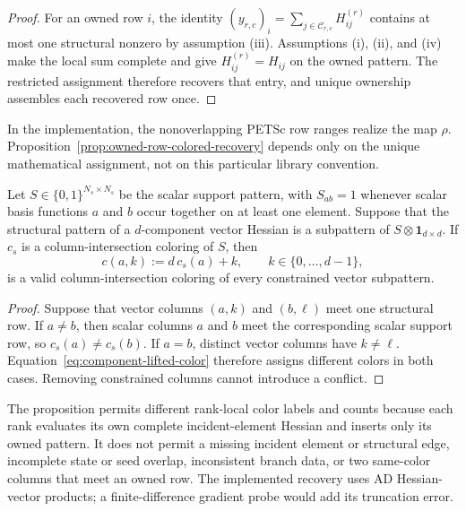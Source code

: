 \begin{proof}
For an owned row $i$, the identity
$(y_{r,c})_i=\sum_{j\in\mathcal{C}_{r,c}}H^{(r)}_{ij}$ contains at most one
structural nonzero by assumption (iii). Assumptions (i), (ii), and (iv) make
the local sum complete and give $H^{(r)}_{ij}=H_{ij}$ on the owned pattern.
The restricted assignment therefore recovers that entry, and unique ownership
assembles each recovered row once.
\end{proof}

In the implementation, the nonoverlapping PETSc row ranges realize the map
$\rho$. Proposition~\ref{prop:owned-row-colored-recovery} depends only on the
unique mathematical assignment, not on this particular library convention.

\begin{proposition}
\label{prop:component-lifted-coloring}
Let $S\in\{0,1\}^{N_s\times N_s}$ be the scalar support pattern, with
$S_{ab}=1$ whenever scalar basis functions $a$ and $b$ occur together on at
least one element. Suppose that the structural pattern of a $d$-component
vector Hessian is a subpattern of $S\otimes\mathbf{1}_{d\times d}$. If $c_s$
is a column-intersection coloring of $S$, then
\begin{equation}
  c(a,k):=d\,c_s(a)+k,
  \qquad k\in\{0,\ldots,d-1\},
  \label{eq:component-lifted-color}
\end{equation}
is a valid column-intersection coloring of every constrained vector subpattern.
\end{proposition}

\begin{proof}
Suppose that vector columns $(a,k)$ and $(b,\ell)$ meet one structural row. If
$a\ne b$, then scalar columns $a$ and $b$ meet the corresponding scalar support
row, so $c_s(a)\ne c_s(b)$. If $a=b$, distinct vector columns have
$k\ne\ell$. Equation~\eqref{eq:component-lifted-color} therefore assigns
different colors in both cases. Removing constrained columns cannot introduce
a conflict.
\end{proof}

The proposition permits different rank-local color labels and counts because
each rank evaluates its own complete incident-element Hessian and inserts only
its owned pattern. It does not permit a missing incident element or structural
edge, incomplete state or seed overlap, inconsistent branch data, or two
same-color columns that meet an owned row. The implemented recovery uses AD
Hessian-vector products; a finite-difference gradient probe would add its
truncation error.

